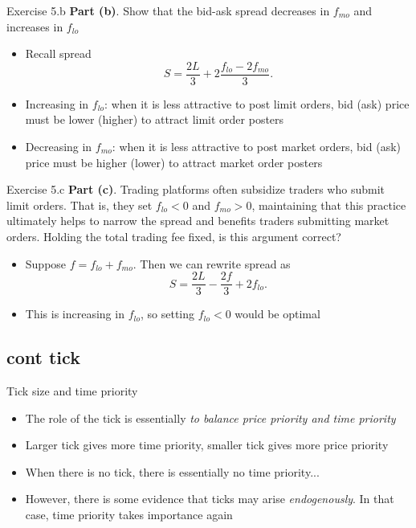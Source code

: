 \documentclass[english,10pt]{beamer}
\begin{document}
\begin{frame}{Exercise 5.b}
	\textbf{Part (b)}. Show that the bid-ask spread decreases in $f_{mo}$ and increases in $f_{lo}$
	\smallskip
	\smallskip
	\begin{itemize}
		\item Recall spread
		\[
		S=\frac{2L}{3}+2\frac{f_{lo}-2f_{mo}}{3}.
		\]
		\item Increasing in $f_{lo}$: when it is less attractive to post limit orders, bid (ask) price must be lower (higher) to attract limit order posters
		\item Decreasing in $f_{mo}$: when it is less attractive to post market orders, bid (ask) price must be higher (lower) to attract market order posters
	\end{itemize}
\end{frame}


\begin{frame}{Exercise 5.c}
	\textbf{Part (c)}. Trading platforms often subsidize traders who submit limit orders. That is, they set $f_{lo}<0$ and $f_{mo}>0$, maintaining that this practice ultimately helps to narrow the spread and benefits traders submitting market orders. Holding the total trading fee fixed, is this argument correct?
	\smallskip
	\smallskip
	\begin{itemize}
		\item Suppose $f=f_{lo}+f_{mo}$. Then we can rewrite spread as
		\[
		S=\frac{2L}{3}-\frac{2f}{3}+2f_{lo}.
		\]
		\item This is increasing in $f_{lo}$, so setting $f_{lo}<0$ would be optimal
	\end{itemize}
\end{frame}


\subsection{cont tick}

\begin{frame}{Tick size and time priority}
	\begin{itemize}
		\item The role of the tick is essentially \textit{to balance price priority and time priority}
		\pause
		\item Larger tick gives more time priority, smaller tick gives more price priority
		\pause
		\item When there is no tick, there is essentially no time priority...
		\pause
		\item However, there is some evidence that ticks may arise \textit{endogenously}. In that case, time priority takes importance again
	\end{itemize}
\end{frame}
\end{document}
